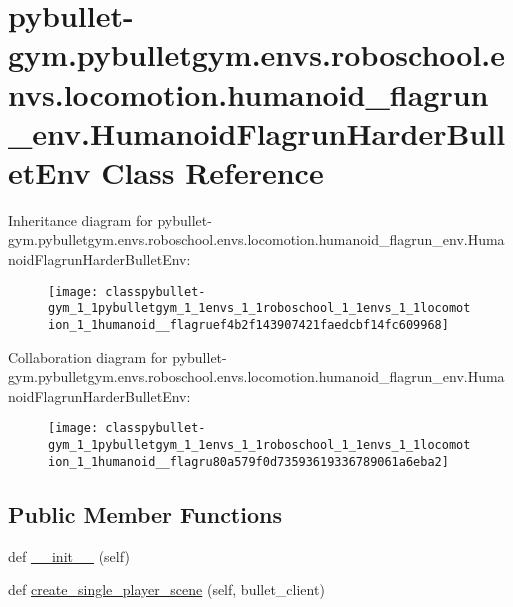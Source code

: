 \hypertarget{classpybullet-gym_1_1pybulletgym_1_1envs_1_1roboschool_1_1envs_1_1locomotion_1_1humanoid__flagrudb0b09e2e64c56870b184e16ccd9ae79}{}\section{pybullet-\/gym.pybulletgym.\+envs.\+roboschool.\+envs.\+locomotion.\+humanoid\+\_\+flagrun\+\_\+env.\+Humanoid\+Flagrun\+Harder\+Bullet\+Env Class Reference}
\label{classpybullet-gym_1_1pybulletgym_1_1envs_1_1roboschool_1_1envs_1_1locomotion_1_1humanoid__flagrudb0b09e2e64c56870b184e16ccd9ae79}


Inheritance diagram for pybullet-\/gym.pybulletgym.\+envs.\+roboschool.\+envs.\+locomotion.\+humanoid\+\_\+flagrun\+\_\+env.\+Humanoid\+Flagrun\+Harder\+Bullet\+Env\+:
\nopagebreak
\begin{figure}[H]
\begin{center}
\leavevmode
\texttt{[image: classpybullet-gym\_1\_1pybulletgym\_1\_1envs\_1\_1roboschool\_1\_1envs\_1\_1locomotion\_1\_1humanoid\_\_flagruef4b2f143907421faedcbf14fc609968]}
\end{center}
\end{figure}


Collaboration diagram for pybullet-\/gym.pybulletgym.\+envs.\+roboschool.\+envs.\+locomotion.\+humanoid\+\_\+flagrun\+\_\+env.\+Humanoid\+Flagrun\+Harder\+Bullet\+Env\+:
\nopagebreak
\begin{figure}[H]
\begin{center}
\leavevmode
\texttt{[image: classpybullet-gym\_1\_1pybulletgym\_1\_1envs\_1\_1roboschool\_1\_1envs\_1\_1locomotion\_1\_1humanoid\_\_flagru80a579f0d73593619336789061a6eba2]}
\end{center}
\end{figure}
\subsection*{Public Member Functions}
\begin{DoxyCompactItemize}
\item 
def \hyperlink{classpybullet-gym_1_1pybulletgym_1_1envs_1_1roboschool_1_1envs_1_1locomotion_1_1humanoid__flagrudb0b09e2e64c56870b184e16ccd9ae79_a96801a1f47dbcad4ff3f6669dfda3184}{\+\_\+\+\_\+init\+\_\+\+\_\+} (self)
\item 
def \hyperlink{classpybullet-gym_1_1pybulletgym_1_1envs_1_1roboschool_1_1envs_1_1locomotion_1_1humanoid__flagrudb0b09e2e64c56870b184e16ccd9ae79_ac2f569e7bbfcb027929439987942e05c}{create\+\_\+single\+\_\+player\+\_\+scene} (self, bullet\+\_\+client)
\end{DoxyCompactItemize}
